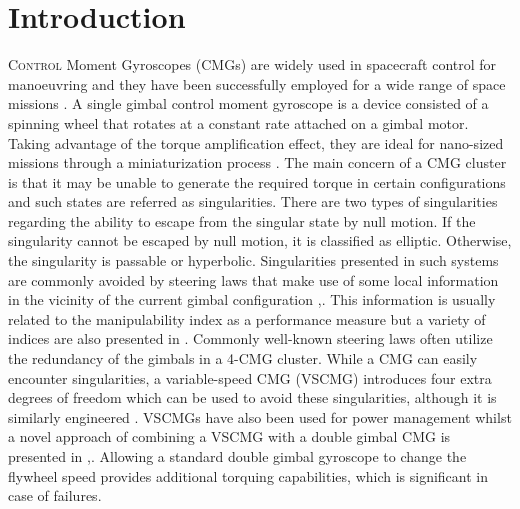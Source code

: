 \documentclass[journal]{new-aiaa}
\begin{document}
\section{Introduction}
\lettrine{C}{ontrol} Moment Gyroscopes (CMGs) are widely used in spacecraft control for manoeuvring and they have been successfully employed for a wide range of space missions \cite{futuremissions,defendini,wie2008space}. A single gimbal control moment gyroscope is a device consisted of a spinning wheel that rotates at a constant rate attached on a gimbal motor. Taking advantage of the torque amplification effect, they are ideal for nano-sized missions through a miniaturization process \cite{lappasminiature}\cite{miniature2}. The main concern of a CMG cluster is that it may be unable to generate the required torque  in certain configurations and such states are referred as singularities. There are two types of singularities regarding the ability to escape from the singular state by null motion\cite{Margulies}. If the singularity cannot be escaped by null motion, it is classified as elliptic. Otherwise, the singularity is passable or hyperbolic.  Singularities presented in such systems are commonly avoided by steering laws that make use of some local information in the vicinity of the current gimbal configuration \cite{bongwie2005},\cite{bongwie2001}. This information is usually related to the manipulability index as a performance measure \cite{yoshikawa} but a variety of indices are also presented in \cite{patel}. Commonly well-known steering laws often utilize the redundancy of the gimbals in a 4-CMG cluster. While a CMG can easily encounter singularities, a variable-speed CMG (VSCMG) introduces four extra degrees of freedom which can be used to avoid these singularities, although it is similarly engineered \cite{SizingLappas}. VSCMGs have also been used for power management \cite{Richie2009,Yoon2002,Hiroyuki2020,Sasaki2018power} whilst a novel approach of combining a VSCMG with a double gimbal CMG is presented in \cite{Sasaki2018},\cite{Stevenson2012}. Allowing a standard double gimbal gyroscope to change the flywheel speed provides additional torquing capabilities, which is significant in case of failures.
\end{document}
